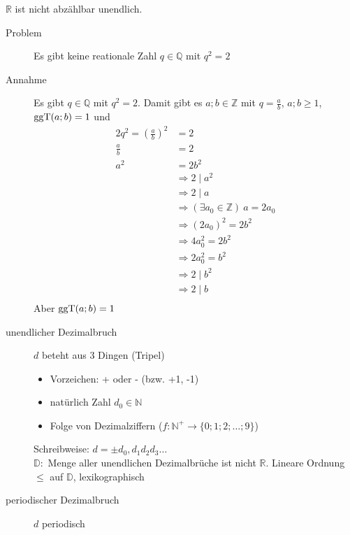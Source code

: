 $\mathbb{R}$ ist nicht abzählbar unendlich.
\begin{description}
    \item[Problem] Es gibt keine reationale Zahl $q \in \mathbb{Q}$ mit $q^2 = 2$
    \item[Annahme] Es gibt $q \in \mathbb{Q}$ mit $q^2 = 2$. Damit gibt es $a;b \in \mathbb{Z}$ mit $q = \frac{a}{b}$, $a;b \geq 1$, $\operatorname{ggT}(a;b) = 1$ und
    \begin{alignat*}{2}
        q^2 = \left( \frac{a}{b}\right)^2 & = 2                                                \\
        \frac{a}{b}                       & = 2                                                \\
        a^2                               & = 2b^2                                             \\
        & \Rightarrow 2 \mid a^2                             \\
        & \Rightarrow 2 \mid a                               \\
        & \Rightarrow (\exists a_0 \in \mathbb{Z})\ a = 2a_0 \\
        & \Rightarrow \left(2a_0\right)^2 = 2b^2             \\
        & \Rightarrow 4a_0^2 = 2b^2                          \\
        & \Rightarrow 2a_0^2 = b^2                           \\
        & \Rightarrow 2 \mid b^2                             \\
        & \Rightarrow 2 \mid b                               \\
    \end{alignat*}
    Aber $\operatorname{ggT}(a;b) = 1$
    \item[unendlicher Dezimalbruch] $d$ beteht aus 3 Dingen (Tripel)
    \begin{itemize}
        \item Vorzeichen: + oder - (bzw. +1, -1)
        \item natürlich Zahl $d_0 \in \mathbb{N}$
        \item Folge von Dezimalziffern ($f : \mathbb{N}^+ \longrightarrow \lbrace 0; 1; 2; \dots ; 9 \rbrace$)
    \end{itemize}
    Schreibweise: $d = \pm d_0,d_1d_2d_3\dots$\\
    $\mathbb{D} :$ Menge aller unendlichen Dezimalbrüche ist nicht $\mathbb{R}$. Lineare Ordnung $\leq$ auf $\mathbb{D}$, lexikographisch
    \item[periodischer Dezimalbruch] $d$ periodisch

\end{description}
